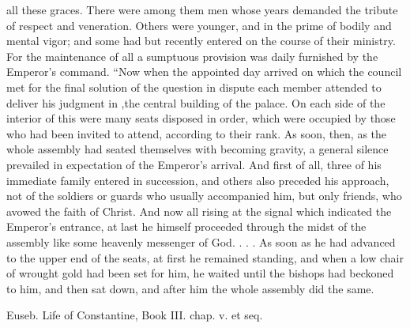all these graces. There were among them men whose years demanded the tribute of respect and veneration. Others were younger, and in the prime of bodily and mental vigor; and some had but recently entered on the course of their ministry. For the maintenance of all a sumptuous provision was daily furnished by the Emperor's command. “Now when the appointed day arrived on which the council met for the final solution of the question in dispute each member attended to deliver his judgment in ,the central building of the palace. On each side of the interior of this were many seats disposed in order, which were occupied by those who had been invited to attend, according to their rank. As soon, then, as the whole assembly had seated themselves with becoming gravity, a general silence prevailed in expectation of the Emperor's arrival. And first of all, three of his immediate family entered in succession, and others also preceded his approach, not of the soldiers or guards who usually accompanied him, but only friends, who avowed the faith of Christ. And now all rising at the signal which indicated the Emperor's entrance, at last he himself proceeded through the midst of the assembly like some heavenly messenger of God. . . . As soon as he had advanced to the upper end of the seats, at first he remained standing, and when a low chair of wrought gold had been set for him, he waited until the bishops had beckoned to him, and then sat down, and after him the whole assembly did the same.

Euseb. Life of Constantine, Book III. chap. v. et seq.

